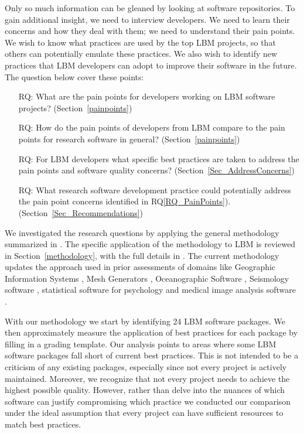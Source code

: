 \documentclass[final, 3p, times, authoryear]{elsarticle}
\newcounter{rqnum} %
\newcommand{\rqref}[1]{RQ\ref{#1}}
\begin{document}
Only so much information can be gleaned by looking at software repositories.  To
gain additional insight, we need to interview developers.  We need to learn
their concerns and how they deal with them; we need to understand their pain
points. We wish to know what practices are used by the top LBM projects, so that
others can potentially emulate these practices. We also wish to identify new
practices that LBM developers can adopt to improve their software in the future.
The question below cover these points: 

\begin{enumerate}
	\item [RQ\refstepcounter{rqnum}\therqnum \label{RQ_PainPoints}:] What are
	the pain points for developers working on LBM software projects?
	(Section~\ref{painpoints})
	\item [RQ\refstepcounter{rqnum}\therqnum \label{RQ_ComparePainPoints}:] How
	do the pain points of developers from LBM compare to the pain points
	for research software in general? (Section~\ref{painpoints})
	\item [RQ\refstepcounter{rqnum}\therqnum \label{RQ_Concerns}:] For LBM
	developers what specific best practices are taken to address the pain points
	and software quality concerns? (Section~\ref{Sec_AddressConcerns})
	\item [RQ\refstepcounter{rqnum}\therqnum \label{RQ_Recommend}:]
	What research software development practice could potentially address the
	pain point concerns identified in \rqref{RQ_PainPoints}).
	(Section~\ref{Sec_Recommendations})
\end{enumerate}

We investigated the research questions by applying the general methodology
summarized in \citet{SmithEtAl2021, SmithAndMichalski2022}.  The specific
application of the methodology to LBM is reviewed in Section~\ref{methodology},
with the full details in \citep{Michalski2021}.  The current methodology updates
the approach used in prior assessments of domains like Geographic Information
Systems \citep{SmithEtAl2018_arXivGIS}, Mesh Generators \citep{SmithEtAl2016},
Oceanographic Software \citep{smith2015state}, Seismology software
\citep{SmithEtAl2018}, statistical software for psychology
\citep{SmithEtAl2018_StatSoft} and medical image analysis software
\citep{Dong2021}.

With our methodology we start by identifying 24 LBM software packages.  We then
approximately measure the application of best practices for each package by
filling in a grading template. Our analysis points to areas where some LBM
software packages fall short of current best practices.  This is not intended to
be a criticism of any existing packages, especially since not every project is
actively maintained.  Moreover, we recognize that not every project needs to
achieve the highest possible quality.  However, rather than delve into the
nuances of which software can justify compromising which practice we conducted
our comparison under the ideal assumption that every project can have sufficient
resources to match best practices.
\end{document}
